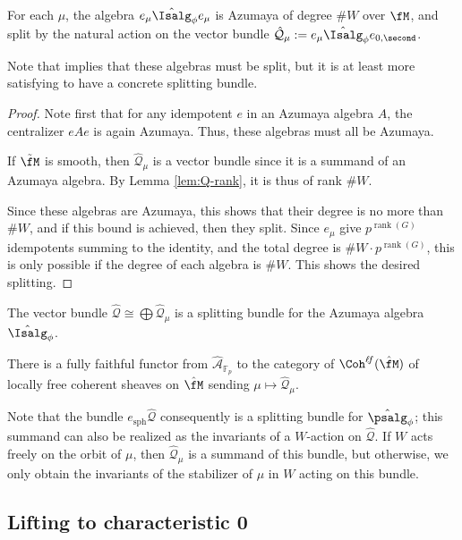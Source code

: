 \begin{lemma}
  For each $\mu$, the algebra $e_\mu\hat{\Isalg}_\phi e_\mu$ is Azumaya of degree $\#W$ over $\fM$, and split by the natural action on the vector bundle $\mathcal{\hat Q}_\mu:=e_\mu\hat{\Isalg}_\phi e_{0,\second}$.
\end{lemma}
Note that \cite[Prop. 1.24]{BKpos} implies that these algebras must be split, but it is at least more satisfying to have a concrete splitting bundle. 
\begin{proof}
 Note first that for any idempotent $e$ in an Azumaya algebra $A$, the centralizer $eAe$ is again Azumaya.  Thus, these algebras must all be Azumaya.

 If $\tilde{\fM}$ is smooth, then  $\mathcal{\hat Q}_\mu$ is a vector bundle since it is a summand of an Azumaya algebra.  By Lemma \ref{lem:Q-rank}, it is thus of rank $\#W$.
  
  Since these algebras are Azumaya, this shows that their degree is no more than $\# W$, and if this bound is achieved, then they split. Since $e_\mu$ give $p^{\operatorname{rank}(G)}$ idempotents summing to the identity, and the total degree is $\# W\cdot p^{\operatorname{rank}(G)}$, this is only possible if the degree of each algebra is $\#W$. This shows the desired splitting.
\end{proof}

\begin{corollary}\label{cor:Q-splitting}
  The vector bundle $\hat{\mathcal{Q}}\cong \bigoplus \hat{\mathcal{Q}}_\mu$ is a splitting bundle for the Azumaya algebra $\hat{\Isalg}_\phi$.

There is a fully faithful functor from  $\widehat{\mathscr{A}}_{\mathbb{F}_p}$ to the category of $\Coh^{\ell \!f}(\hat{\fM})$ of locally free coherent sheaves on $\hat{\fM}$ sending  $\mu\mapsto \hat{\mathcal{Q}}_\mu$.  
\end{corollary}

Note that the bundle $e_{\operatorname{sph}}\hat{\mathcal{Q}}$ consequently is a splitting bundle for $\hat{\psalg} _\phi$; this summand can also be realized 
as the invariants of a $W$-action on $\hat{\mathcal{Q}}$.   If $W$ acts freely on the orbit of $\mu$, then $\hat{\mathcal{Q}}_\mu$ is a summand of this bundle, but otherwise, we only obtain the invariants of the stabilizer of $\mu$ in $W$ acting on this bundle.


\subsection{Lifting to characteristic 0}


